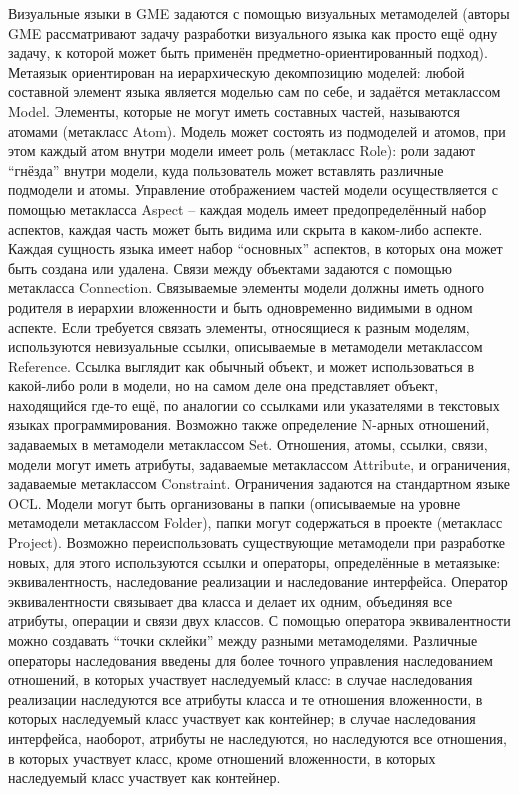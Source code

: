 	Визуальные языки в GME задаются с помощью визуальных метамоделей (авторы GME рассматривают задачу разработки визуального языка как просто ещё одну задачу, к которой может быть применён предметно-ориентированный подход). Метаязык ориентирован на иерархическую декомпозицию моделей: любой составной элемент языка является моделью сам по себе, и задаётся метаклассом Model. Элементы, которые не могут иметь составных частей, называются атомами (метакласс Atom). Модель может состоять из подмоделей и атомов, при этом каждый атом внутри модели имеет роль (метакласс Role): роли задают “гнёзда” внутри модели, куда пользователь может вставлять различные подмодели и атомы. Управление отображением частей модели осуществляется с помощью метакласса Aspect – каждая модель имеет предопределённый набор аспектов, каждая часть может быть видима или скрыта в каком-либо аспекте. Каждая сущность языка имеет набор “основных” аспектов, в которых она может быть создана или удалена. Связи между объектами задаются с помощью метакласса Connection. Связываемые элементы модели должны иметь одного родителя в иерархии вложенности и быть одновременно видимыми в одном аспекте. Если требуется связать элементы, относящиеся к разным моделям, используются невизуальные ссылки, описываемые в метамодели метаклассом Reference. Ссылка выглядит как обычный объект, и может использоваться в какой-либо роли в модели, но на самом деле она представляет объект, находящийся где-то ещё, по аналогии со ссылками или указателями в текстовых языках программирования. Возможно также определение N-арных отношений, задаваемых в метамодели метаклассом Set. Отношения, атомы, ссылки, связи, модели могут иметь атрибуты, задаваемые метаклассом Attribute, и ограничения, задаваемые метаклассом Constraint. Ограничения задаются на стандартном языке OCL. Модели могут быть организованы в папки (описываемые на уровне метамодели метаклассом Folder), папки могут содержаться в проекте (метакласс Project).
	Возможно переиспользовать существующие метамодели при разработке новых, для этого используются ссылки и операторы, определённые в метаязыке: эквивалентность, наследование реализации и наследование интерфейса. Оператор эквивалентности связывает два класса и делает их одним, объединяя все атрибуты, операции и связи двух классов. С помощью оператора эквивалентности можно создавать “точки склейки” между разными метамоделями. Различные операторы наследования введены для более точного управления наследованием отношений, в которых участвует наследуемый класс: в случае наследования реализации наследуются все атрибуты класса и те отношения вложенности, в которых наследуемый класс участвует как контейнер; в случае наследования интерфейса, наоборот, атрибуты не наследуются, но наследуются все отношения, в которых участвует класс, кроме отношений вложенности, в которых наследуемый класс участвует как контейнер.
